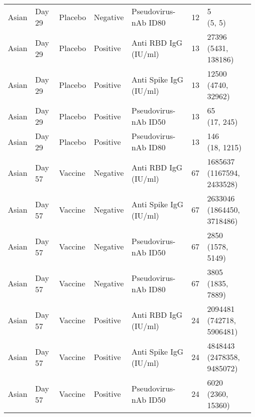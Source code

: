 \documentclass[]{book}
\theoremstyle{definition}
\theoremstyle{definition}
\theoremstyle{definition}
\newcommand{\1}{\mathbbm{1}}
\begin{document}
\begin{landscape}
\begin{ThreePartTable}
\begin{longtable}[t]{>{\raggedright\arraybackslash}p{7cm}llllll}
\hspace{1em}Asian & Day 29 & Placebo & Negative & Pseudovirus-nAb ID80 & 12 & \makecell[l]{5\\(5, 5)}\\
\hspace{1em}Asian & Day 29 & Placebo & Positive & Anti RBD IgG (IU/ml) & 13 & \makecell[l]{27396\\(5431, 138186)}\\
\hspace{1em}Asian & Day 29 & Placebo & Positive & Anti Spike IgG (IU/ml) & 13 & \makecell[l]{12500\\(4740, 32962)}\\
\hspace{1em}Asian & Day 29 & Placebo & Positive & Pseudovirus-nAb ID50 & 13 & \makecell[l]{65\\(17, 245)}\\
\hspace{1em}Asian & Day 29 & Placebo & Positive & Pseudovirus-nAb ID80 & 13 & \makecell[l]{146\\(18, 1215)}\\
\hspace{1em}Asian & Day 57 & Vaccine & Negative & Anti RBD IgG (IU/ml) & 67 & \makecell[l]{1685637\\(1167594, 2433528)}\\
\hspace{1em}Asian & Day 57 & Vaccine & Negative & Anti Spike IgG (IU/ml) & 67 & \makecell[l]{2633046\\(1864450, 3718486)}\\
\hspace{1em}Asian & Day 57 & Vaccine & Negative & Pseudovirus-nAb ID50 & 67 & \makecell[l]{2850\\(1578, 5149)}\\
\hspace{1em}Asian & Day 57 & Vaccine & Negative & Pseudovirus-nAb ID80 & 67 & \makecell[l]{3805\\(1835, 7889)}\\
\hspace{1em}Asian & Day 57 & Vaccine & Positive & Anti RBD IgG (IU/ml) & 24 & \makecell[l]{2094481\\(742718, 5906481)}\\
\hspace{1em}Asian & Day 57 & Vaccine & Positive & Anti Spike IgG (IU/ml) & 24 & \makecell[l]{4848443\\(2478358, 9485072)}\\
\hspace{1em}Asian & Day 57 & Vaccine & Positive & Pseudovirus-nAb ID50 & 24 & \makecell[l]{6020\\(2360, 15360)}\\

\end{longtable}
\end{ThreePartTable}
\end{landscape}
\end{document}
